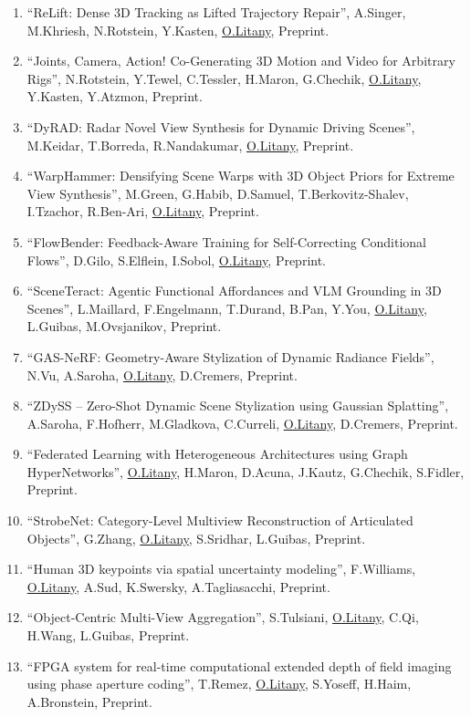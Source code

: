 \begin{enumerate}

\item ``ReLift: Dense 3D Tracking as Lifted Trajectory Repair'', A.Singer, M.Khriesh, N.Rotstein, Y.Kasten, \underline{O.Litany}, Preprint.

\item ``Joints, Camera, Action! Co-Generating 3D Motion and Video for Arbitrary Rigs'', N.Rotstein, Y.Tewel, C.Tessler, H.Maron, G.Chechik, \underline{O.Litany}, Y.Kasten, Y.Atzmon, Preprint.

\item ``DyRAD: Radar Novel View Synthesis for Dynamic Driving Scenes'', M.Keidar, T.Borreda, R.Nandakumar, \underline{O.Litany}, Preprint.

\item ``WarpHammer: Densifying Scene Warps with 3D Object Priors for Extreme View Synthesis'', M.Green, G.Habib, D.Samuel, T.{Berkovitz-Shalev}, I.Tzachor, R.Ben-Ari, \underline{O.Litany}, Preprint.

\item ``FlowBender: Feedback-Aware Training for Self-Correcting Conditional Flows'', D.Gilo, S.Elflein, I.Sobol, \underline{O.Litany}, Preprint.

\item ``{SceneTeract: Agentic Functional Affordances and VLM Grounding in 3D Scenes}'', L.Maillard, F.Engelmann, T.Durand, B.Pan, Y.You, \underline{O.Litany}, L.Guibas, M.Ovsjanikov, Preprint.

\item ``GAS-NeRF: Geometry-Aware Stylization of Dynamic Radiance Fields'', N.Vu, A.Saroha, \underline{O.Litany}, D.Cremers, Preprint.

\item ``ZDySS -- Zero-Shot Dynamic Scene Stylization using Gaussian Splatting'', A.Saroha, F.Hofherr, M.Gladkova, C.Curreli, \underline{O.Litany}, D.Cremers, Preprint.

\item ``Federated Learning with Heterogeneous Architectures using Graph {HyperNetworks}'', \underline{O.Litany}, H.Maron, D.Acuna, J.Kautz, G.Chechik, S.Fidler, Preprint.

\item ``{StrobeNet}: Category-Level Multiview Reconstruction of Articulated Objects'', G.Zhang, \underline{O.Litany}, S.Sridhar, L.Guibas, Preprint.

\item ``Human 3D keypoints via spatial uncertainty modeling'', F.Williams, \underline{O.Litany}, A.Sud, K.Swersky, A.Tagliasacchi, Preprint.

\item ``Object-Centric Multi-View Aggregation'', S.Tulsiani, \underline{O.Litany}, C.Qi, H.Wang, L.Guibas, Preprint.

\item ``FPGA system for real-time computational extended depth of field imaging using phase aperture coding'', T.Remez, \underline{O.Litany}, S.Yoseff, H.Haim, A.Bronstein, Preprint.

\end{enumerate}